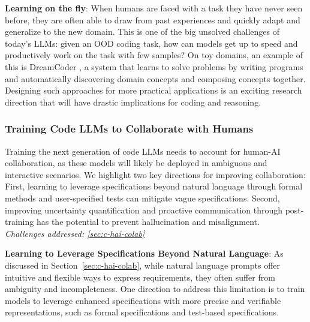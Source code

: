 \textbf{Learning on the fly}: When humans are faced with a task they have never seen before, they are often able to draw from past experiences and quickly adapt and generalize to the new domain. This is one of the big unsolved challenges of today's LLMs: given an OOD coding task, how can models get up to speed and productively work on the task with few samples? On toy domains, an example of this is DreamCoder \citep{ellis2021dreamcoder}, a system that learns to solve problems by writing programs and automatically discovering domain concepts and composing concepts together. Designing such approaches for more practical applications is an exciting research direction that will have drastic implications for coding and reasoning.

\subsubsection{Training Code LLMs to Collaborate with Humans}
\label{sec:d-hai-training}
\begin{tcolorbox}[colback=lightorange, boxrule=0pt, arc=5pt, outer arc=5pt]

Training the next generation of code LLMs needs to account for human-AI collaboration, as these models will likely be deployed in ambiguous and interactive scenarios. We highlight two key directions for improving collaboration: First, learning to leverage specifications beyond natural language through formal methods and user-specified tests can mitigate vague specifications. Second, improving uncertainty quantification and proactive communication through post-training has the potential to prevent hallucination and misalignment.
\newline \\
\textit{Challenges addressed: \ref{sec:c-hai-colab}}
\end{tcolorbox}

\textbf{Learning to Leverage Specifications Beyond Natural Language}: As discussed in Section~\ref{sec:c-hai-colab}, while natural language prompts offer intuitive and flexible ways to express requirements, they often suffer from ambiguity and incompleteness. One direction to address this limitation is to train models to leverage enhanced specifications with more precise and verifiable representations, such as formal specifications and test-based specifications.

